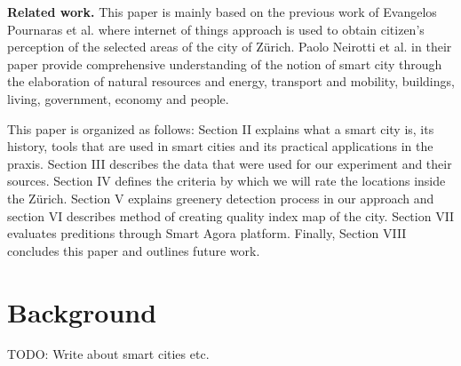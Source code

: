 \documentclass[letterpaper]{article}
\newcommand{\mypar}[1]{{\bf #1.}}
\begin{document}
\mypar{Related work} This paper is mainly based on the previous work of Evangelos Pournaras et al. \cite{smartCities}
where internet of things approach is used to obtain citizen's perception of the selected areas of the city of Zürich.
Paolo Neirotti et al. \cite{smartCities2} in their paper provide comprehensive understanding of the notion of smart city
through the elaboration of natural resources and energy, transport and mobility, buildings, living, government, economy
and people.

\indent This paper is organized as follows: Section II explains what a smart city is, its history, tools that are used
in smart cities and its practical applications in the praxis. Section III describes the data that were used for our
experiment and their sources. Section IV defines the criteria by which we will rate the locations inside the Zürich.
Section V explains greenery detection process in our approach and section VI describes method of creating quality index
map of the city. Section VII evaluates preditions through Smart Agora platform. Finally, Section VIII concludes this
paper and outlines future work.

\section{Background}\label{sec:background}
TODO: Write about smart cities etc.
\end{document}
